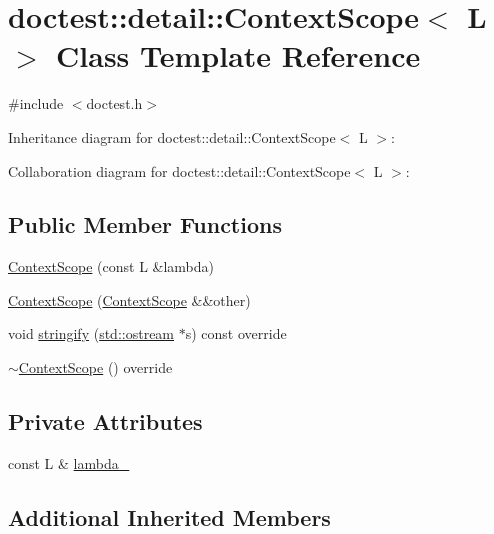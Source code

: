 \hypertarget{classdoctest_1_1detail_1_1ContextScope}{}\section{doctest\+:\+:detail\+:\+:Context\+Scope$<$ L $>$ Class Template Reference}
\label{classdoctest_1_1detail_1_1ContextScope}


{\ttfamily \#include $<$doctest.\+h$>$}



Inheritance diagram for doctest\+:\+:detail\+:\+:Context\+Scope$<$ L $>$\+:


Collaboration diagram for doctest\+:\+:detail\+:\+:Context\+Scope$<$ L $>$\+:
\subsection*{Public Member Functions}
\begin{DoxyCompactItemize}
\item 
\hyperlink{classdoctest_1_1detail_1_1ContextScope_a344c76a0374615d567a084c0a0ffd215}{Context\+Scope} (const L \&lambda)
\item 
\hyperlink{classdoctest_1_1detail_1_1ContextScope_afca3228fdeb0e86257a21f826c4247ff}{Context\+Scope} (\hyperlink{classdoctest_1_1detail_1_1ContextScope}{Context\+Scope} \&\&other)
\item 
void \hyperlink{classdoctest_1_1detail_1_1ContextScope_a4636ac32ae41ae108c7ada4a164ffaeb}{stringify} (\hyperlink{doctest_8h_a116af65cb5e924b33ad9d9ecd7a783f3}{std\+::ostream} $\ast$s) const override
\item 
\hyperlink{classdoctest_1_1detail_1_1ContextScope_a1ee7d4702398ee8d0e80ab843aa260d7}{$\sim$\+Context\+Scope} () override
\end{DoxyCompactItemize}
\subsection*{Private Attributes}
\begin{DoxyCompactItemize}
\item 
const L \& \hyperlink{classdoctest_1_1detail_1_1ContextScope_a9f7ddcea45f01c995765696017e31c3e}{lambda\+\_\+}
\end{DoxyCompactItemize}
\subsection*{Additional Inherited Members}


